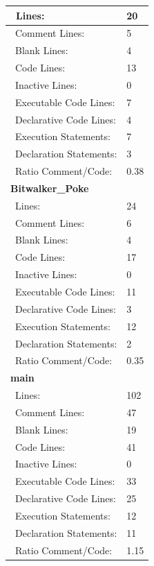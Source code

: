 \begin{longtable}{||p{}|p{}||}
\\\hline
    \ Lines: & 20
    \\
    \hline
    \ Comment Lines: & 5
    \\
    \hline
    \ Blank Lines: & 4
    \\
    \hline
    \ Code Lines:  & 13
    \\
    \hline
    \ Inactive Lines:  & 0
    \\
    \hline
    \ Executable Code Lines:  & 7
    \\
    \hline
    \ Declarative Code Lines:  & 4
    \\
    \hline
    \ Execution Statements:  & 7
    \\
    \hline
    \ Declaration Statements:  & 3
    \\
    \hline
    \ Ratio Comment/Code:  & 0.38
    \\
    \hline
        \multicolumn{2}{||l||}{\textbf{Bitwalker\_Poke}}
\\\hline
    \ Lines: & 24
    \\
    \hline
    \ Comment Lines: & 6
    \\
    \hline
    \ Blank Lines: & 4
    \\
    \hline
    \ Code Lines:  & 17
    \\
    \hline
    \ Inactive Lines:  & 0
    \\
    \hline
    \ Executable Code Lines:  & 11
    \\
    \hline
    \ Declarative Code Lines:  & 3
    \\
    \hline
    \ Execution Statements:  & 12
    \\
    \hline
    \ Declaration Statements:  & 2
    \\
    \hline
    \ Ratio Comment/Code:  & 0.35
    \\
    \hline
    \multicolumn{2}{||l||}{\textbf{main}}
\\\hline
    \ Lines: & 102
    \\
    \hline
    \ Comment Lines: & 47
    \\
    \hline
    \ Blank Lines: & 19
    \\
    \hline
    \ Code Lines:  & 41
    \\
    \hline
    \ Inactive Lines:  & 0
    \\
    \hline
    \ Executable Code Lines:  & 33
    \\
    \hline
    \ Declarative Code Lines:  & 25
    \\
    \hline
    \ Execution Statements:  & 12
    \\
    \hline
    \ Declaration Statements:  & 11
    \\
    \hline
    \ Ratio Comment/Code:  & 1.15
    \\
    \hline
\end{longtable}

